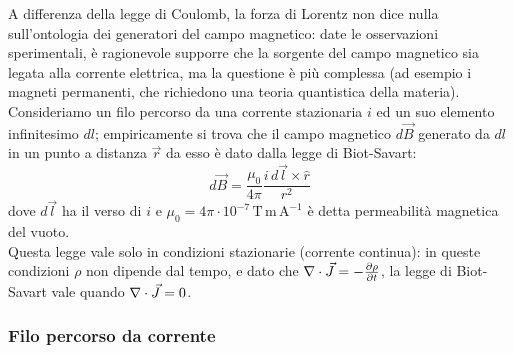 \documentclass[]{article}
\begin{document}
A differenza della legge di Coulomb, la forza di Lorentz non dice nulla sull'ontologia dei generatori del campo magnetico: date le osservazioni sperimentali, è ragionevole supporre che la sorgente del campo magnetico sia legata alla corrente elettrica, ma la questione è più complessa (ad esempio i magneti permanenti, che richiedono una teoria quantistica della materia). \\ 
%
Consideriamo un filo percorso da una corrente stazionaria $ i $ ed un suo elemento infinitesimo $ dl $; empiricamente si trova che il campo magnetico $ d\vec{B} $ generato da $ dl $ in un punto a distanza $ \vec{r} $ da esso è dato dalla legge di Biot-Savart:
\begin{equation}
	d\vec{B} = \displaystyle\frac{\mu_0}{4\pi} \displaystyle\frac{i \, d\vec{l} \times \hat{r}}{r^2}
	\label{eq:biot-savart}
\end{equation}
dove $ d\vec{l} $ ha il verso di $ i $ e $ \mu_0 = 4\pi \cdot 10^{-7} \, \text{T} \, \text{m} \, \text{A}^{-1} $ è detta permeabilità magnetica del vuoto. \\ 
%
Questa legge vale solo in condizioni stazionarie (corrente continua): in queste condizioni $ \rho $ non dipende dal tempo, e dato che $ \nabla\cdot\vec{J} = -\frac{\partial \rho}{\partial t} $, la legge di Biot-Savart vale quando $ \nabla\cdot\vec{J} = 0 $.

\subsubsection{Filo percorso da corrente}
\end{document}
